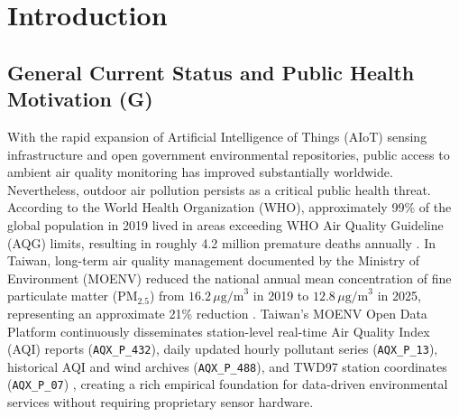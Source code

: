 \section{Introduction}

\subsection{General Current Status and Public Health Motivation (G)}
With the rapid expansion of Artificial Intelligence of Things (AIoT) sensing infrastructure and open government environmental repositories, public access to ambient air quality monitoring has improved substantially worldwide. Nevertheless, outdoor air pollution persists as a critical public health threat. According to the World Health Organization (WHO), approximately 99\% of the global population in 2019 lived in areas exceeding WHO Air Quality Guideline (AQG) limits, resulting in roughly 4.2 million premature deaths annually \cite{who2021,who2024}. In Taiwan, long-term air quality management documented by the Ministry of Environment (MOENV) reduced the national annual mean concentration of fine particulate matter ($\text{PM}_{2.5}$) from $16.2\,\mu\text{g/m}^3$ in 2019 to $12.8\,\mu\text{g/m}^3$ in 2025, representing an approximate 21\% reduction \cite{moenv2026news,moenv2026stat}. Taiwan's MOENV Open Data Platform continuously disseminates station-level real-time Air Quality Index (AQI) reports (\texttt{AQX\_P\_432}), daily updated hourly pollutant series (\texttt{AQX\_P\_13}), historical AQI and wind archives (\texttt{AQX\_P\_488}), and TWD97 station coordinates (\texttt{AQX\_P\_07}) \cite{aqxp432,aqxp488,aqxp13,aqxp07}, creating a rich empirical foundation for data-driven environmental services without requiring proprietary sensor hardware.

